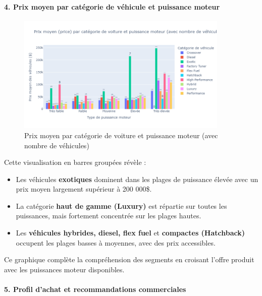 \documentclass[12pt]{report}
\begin{document}
\paragraph{4. Prix moyen par catégorie de véhicule et puissance moteur}\mbox{}

\begin{figure}[H]
\centering
\includegraphics[width=0.9\textwidth]{price_vs_hp_market.png}
\caption{Prix moyen par catégorie de voiture et puissance moteur (avec nombre de véhicules)}
\end{figure}

Cette visualisation en barres groupées révèle :
\begin{itemize}
  \item Les véhicules \textbf{exotiques} dominent dans les plages de puissance élevée avec un prix moyen largement supérieur à 200 000\$.
  \item La catégorie \textbf{haut de gamme (Luxury)} est répartie sur toutes les puissances, mais fortement concentrée sur les plages hautes.
  \item Les \textbf{véhicules hybrides, diesel, flex fuel} et \textbf{compactes (Hatchback)} occupent les plages basses à moyennes, avec des prix accessibles.
\end{itemize}

Ce graphique complète la compréhension des segments en croisant l’offre produit avec les puissances moteur disponibles.

\paragraph{5. Profil d’achat et recommandations commerciales}\mbox{}

\vspace{0.5cm}
\end{document}
